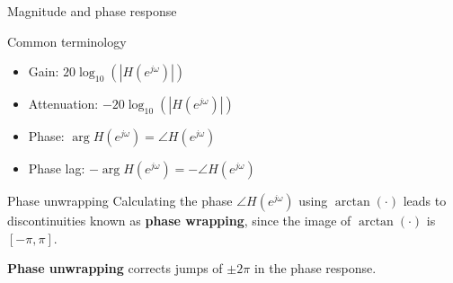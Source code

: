 \documentclass[10pt, handout]{beamer}
\begin{document}
%
\begin{frame}{Magnitude and phase response}
	\begin{block}{Common terminology}
		\begin{itemize}
			\item Gain: $20\log_{10}(|H(e^{j\omega})|)$
			\item Attenuation: $-20\log_{10}(|H(e^{j\omega})|)$
			\item Phase: $\arg H(e^{j\omega}) = \angle H(e^{j\omega})$
			\item Phase lag: $-\arg H(e^{j\omega}) = -\angle H(e^{j\omega})$
		\end{itemize}
	\end{block}
	
	\begin{center}
	\end{center}
\end{frame}

%
\begin{frame}{Phase unwrapping}
	Calculating the phase $\angle H(e^{j\omega})$ using $\arctan(\cdot)$ leads to discontinuities known as \textbf{phase wrapping}, since the image of $\arctan(\cdot)$ is $[-\pi, \pi]$.
	
	\textbf{Phase unwrapping} corrects jumps of $\pm2\pi$ in the phase response.
	
	\begin{center}
		\resizebox{\textwidth}{!}{}
	\end{center}	
	
\end{frame}
\end{document}
